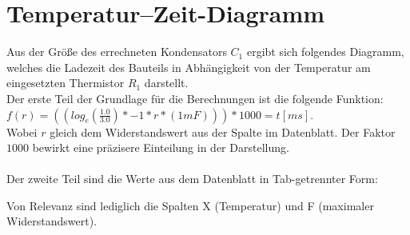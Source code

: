 \documentclass[12pt,titlepage]{article}
\begin{document}
	\section{Temperatur--Zeit-Diagramm}
		Aus der Größe des errechneten Kondensators $C_1$ ergibt sich folgendes Diagramm, welches die Ladezeit des Bauteils in Abhängigkeit von der Temperatur am eingesetzten Thermistor $R_1$ darstellt.\\
		Der erste Teil der Grundlage für die Berechnungen ist die folgende Funktion: \\
		$f(r) = ((log_e(\frac{1.0}{3.0})*-1*r*(1mF)))*1000 = t [ms]$.\\
		Wobei $r$ gleich dem Widerstandswert aus der Spalte im Datenblatt. Der Faktor $1000$ bewirkt eine präzisere Einteilung in der Darstellung.\\
		\hfill\\
		Der zweite Teil sind die Werte aus dem Datenblatt in Tab-getrennter Form:
		
		Von Relevanz sind lediglich die Spalten X (Temperatur) und F (maximaler Widerstandswert).
		
\end{document}
